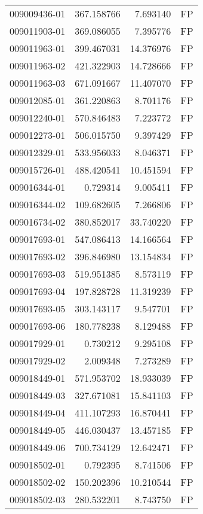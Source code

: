 \begin{tabular}{lrrl}
009009436-01 &  367.158766 &     7.693140 &   FP \\
009011903-01 &  369.086055 &     7.395776 &   FP \\
009011963-01 &  399.467031 &    14.376976 &   FP \\
009011963-02 &  421.322903 &    14.728666 &   FP \\
009011963-03 &  671.091667 &    11.407070 &   FP \\
009012085-01 &  361.220863 &     8.701176 &   FP \\
009012240-01 &  570.846483 &     7.223772 &   FP \\
009012273-01 &  506.015750 &     9.397429 &   FP \\
009012329-01 &  533.956033 &     8.046371 &   FP \\
009015726-01 &  488.420541 &    10.451594 &   FP \\
009016344-01 &    0.729314 &     9.005411 &   FP \\
009016344-02 &  109.682605 &     7.266806 &   FP \\
009016734-02 &  380.852017 &    33.740220 &   FP \\
009017693-01 &  547.086413 &    14.166564 &   FP \\
009017693-02 &  396.846980 &    13.154834 &   FP \\
009017693-03 &  519.951385 &     8.573119 &   FP \\
009017693-04 &  197.828728 &    11.319239 &   FP \\
009017693-05 &  303.143117 &     9.547701 &   FP \\
009017693-06 &  180.778238 &     8.129488 &   FP \\
009017929-01 &    0.730212 &     9.295108 &   FP \\
009017929-02 &    2.009348 &     7.273289 &   FP \\
009018449-01 &  571.953702 &    18.933039 &   FP \\
009018449-03 &  327.671081 &    15.841103 &   FP \\
009018449-04 &  411.107293 &    16.870441 &   FP \\
009018449-05 &  446.030437 &    13.457185 &   FP \\
009018449-06 &  700.734129 &    12.642471 &   FP \\
009018502-01 &    0.792395 &     8.741506 &   FP \\
009018502-02 &  150.202396 &    10.210544 &   FP \\
009018502-03 &  280.532201 &     8.743750 &   FP \\

\end{tabular}
